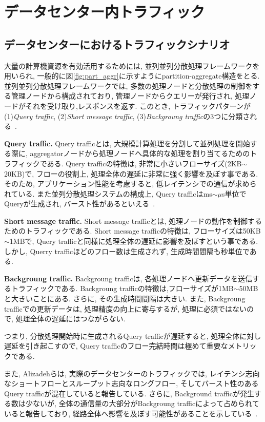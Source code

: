 \documentclass[11pt, a4paper, twocolumn]{jsarticle}
\begin{document}
\section{データセンター内トラフィック}

\subsection{データセンターにおけるトラフィックシナリオ}
\label{sec:traffic_scenario}
大量の計算機資源を有効活用するためには,
並列並列分散処理フレームワークを用いられ, 一般的に図\ref{fig:part_aggr}に示すようにpartition-aggregate構造をとる.
並列並列分散処理フレームワークでは, 多数の処理ノードと分散処理の制御をする管理ノードから構成されており, 管理ノードからクエリーが発行され,
処理ノードがそれを受け取り,レスポンスを返す.
このとき, トラフィックパターンが  (1){\it Query traffic}, (2){\it Short message
traffic}, (3){\it Backgroung traffic}の3つに分類される~\cite{dctcp}.

{\bf Query traffic. }Query trafficとは, 大規模計算処理を分割して並列処理を開始する際に,
aggregatorノードから処理ノードへ具体的な処理を割り当てるためのトラフィックである.
Query trafficの特徴は, 非常に小さいフローサイズ(2KB$\sim$20KB)で,
フローの役割上, 処理全体の遅延に非常に強く影響を及ぼす事である.
そのため, アプリケーション性能を考慮すると, 低レイテンシでの通信が求められている.
また並列分散処理システムの構成上, Query trafficはms$\sim \mu$s単位でQueryが生成され,
バースト性があるといえる~\cite{dctcp}.

{\bf Short message traffic. } Short message trafficとは,
処理ノードの動作を制御するためのトラフィックである.
Short message trafficの特徴は, フローサイズは50KB$\sim$1MBで, Query
trafficと同様に処理全体の遅延に影響を及ぼすという事である.
しかし, Querry trafficほどのフロー数は生成されず, 生成時間間隔も秒単位である.

{\bf Backgroung traffic. }Backgroung trafficは,
各処理ノードへ更新データを送信するトラフィックである.
Backgroung trafficの特徴は,フローサイズが1MB$\sim$50MBと大きいことにある.
さらに, その生成時間間隔は大きい.
また, Backgroung trafficでの更新データは, 処理精度の向上に寄与するが, 処理に必須ではないので,
処理全体の遅延にはつながらない.

つまり, 分散処理開始時に生成されるQuery trafficが遅延すると,
処理全体に対し遅延を引き起こすので, Query trafficのフロー完結時間は極めて重要なメトリックである.

また, Alizadehらは, 実際のデータセンターのトラフィックでは, レイテンシ志向なショートフローとスループット志向なロングフロー,
そしてバースト性のあるQuery trafficが混在していると報告している.
さらに, Background trafficが発生する数は少ないが,
全体の通信量の大部分がBackgroung trafficによって占められていると報告しており,
経路全体へ影響を及ぼす可能性があることを示している~\cite{traffic}.
\end{document}
